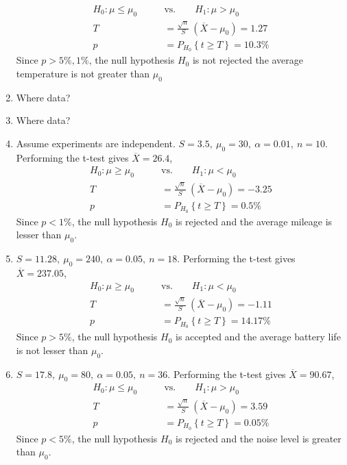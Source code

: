 \begin{enumerate}
		\begin{align}
			H_0 : \mu \leq \mu_0 \qquad &\text{vs.} \qquad H_1 : \mu > \mu_0 \nonumber \\
			T &= \frac{\sqrt{n}}{S}\ (\overline{X} - \mu_0) = 1.27 \nonumber \\
			p &= P_{H_0}\left\{t \geq T\right\} = 10.3\% 
		\end{align}
		Since $ p > 5\%, 1\% $, the null hypothesis $ H_0 $ is not rejected the average temperature is not greater than $ \mu_0 $\\
	
	
	\item Where data? \\
	
	\item Where data? \\
	
	\item Assume experiments are independent.
		$ S = 3.5,\ \mu_0 = 30,\ \alpha = 0.01,\ n = 10$. Performing the t-test gives $ \overline{X} = 26.4 $,
		\begin{align}
			H_0 : \mu \geq \mu_0 \qquad &\text{vs.} \qquad H_1 : \mu < \mu_0 \nonumber \\
			T &= \frac{\sqrt{n}}{S}\ (\overline{X} - \mu_0) = -3.25 \nonumber \\
			p &= P_{H_0}\left\{t \geq T\right\} = 0.5\% 
		\end{align}
		Since $ p < 1\% $, the null hypothesis $ H_0 $ is rejected and the average mileage is lesser than $ \mu_0 $.
		
	\item $ S = 11.28,\ \mu_0 = 240,\ \alpha = 0.05,\ n = 18$. Performing the t-test gives $ \overline{X} = 237.05 $,
	\begin{align}
		H_0 : \mu \geq \mu_0 \qquad &\text{vs.} \qquad H_1 : \mu < \mu_0 \nonumber \\
		T &= \frac{\sqrt{n}}{S}\ (\overline{X} - \mu_0) = -1.11 \nonumber \\
		p &= P_{H_0}\left\{t \geq T\right\} = 14.17\% 
	\end{align}
	Since $ p > 5\% $, the null hypothesis $ H_0 $ is accepted and the average battery life is not lesser than $ \mu_0 $.
	
	\item $ S = 17.8,\ \mu_0 = 80,\ \alpha = 0.05,\ n = 36$. Performing the t-test gives $ \overline{X} = 90.67 $,
	\begin{align}
		H_0 : \mu \leq \mu_0 \qquad &\text{vs.} \qquad H_1 : \mu > \mu_0 \nonumber \\
		T &= \frac{\sqrt{n}}{S}\ (\overline{X} - \mu_0) = 3.59 \nonumber \\
		p &= P_{H_0}\left\{t \geq T\right\} = 0.05\% 
	\end{align}
	Since $ p < 5\% $, the null hypothesis $ H_0 $ is rejected and the noise level is greater than $ \mu_0 $.
	

\end{enumerate}
